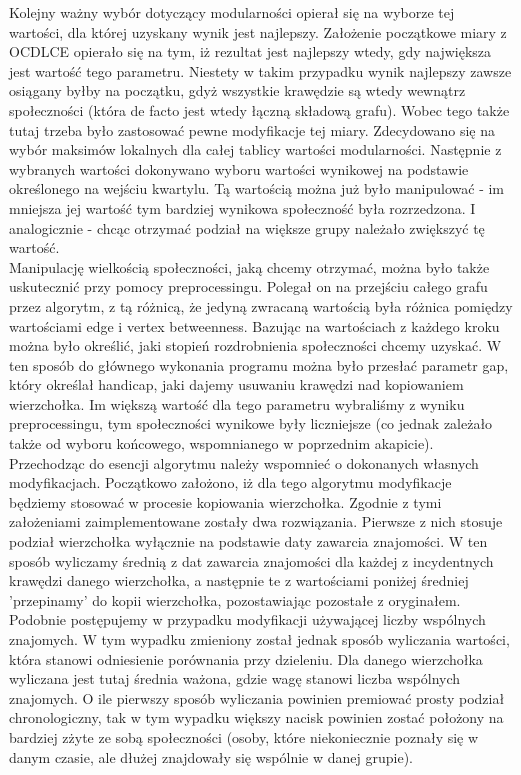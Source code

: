 \documentclass{article}
\begin{document}
Kolejny ważny wybór dotyczący modularności opierał się na wyborze tej wartości, dla której uzyskany wynik jest najlepszy. Założenie początkowe miary z OCDLCE opierało się na tym, iż rezultat jest najlepszy wtedy, gdy największa jest wartość tego parametru. Niestety w takim przypadku wynik najlepszy zawsze osiągany byłby na początku, gdyż wszystkie krawędzie są wtedy wewnątrz społeczności (która de facto jest wtedy łączną składową grafu). Wobec tego także tutaj trzeba było zastosować pewne modyfikacje tej miary. Zdecydowano się na wybór maksimów lokalnych dla całej tablicy wartości modularności. Następnie z wybranych wartości dokonywano wyboru wartości wynikowej na podstawie określonego na wejściu kwartylu. Tą wartością można już było manipulować - im mniejsza jej wartość tym bardziej wynikowa społeczność była rozrzedzona. I analogicznie - chcąc otrzymać podział na większe grupy należało zwiększyć tę wartość.\\

Manipulację wielkością społeczności, jaką chcemy otrzymać, można było także uskutecznić przy pomocy preprocessingu. Polegał on na przejściu całego grafu przez algorytm, z tą różnicą, że jedyną zwracaną wartością była różnica pomiędzy wartościami edge i vertex betweenness. Bazując na wartościach z każdego kroku można było określić, jaki stopień rozdrobnienia społeczności chcemy uzyskać. W ten sposób do głównego wykonania programu można było przesłać parametr gap, który określał handicap, jaki dajemy usuwaniu krawędzi nad kopiowaniem wierzchołka. Im większą wartość dla tego parametru wybraliśmy z wyniku preprocessingu, tym społeczności wynikowe były liczniejsze (co jednak zależało także od wyboru końcowego, wspomnianego w poprzednim akapicie).\\

Przechodząc do esencji algorytmu należy wspomnieć o dokonanych własnych modyfikacjach. Początkowo założono, iż dla tego algorytmu modyfikacje będziemy stosować w procesie kopiowania wierzchołka. Zgodnie z tymi założeniami zaimplementowane zostały dwa rozwiązania. Pierwsze z nich stosuje podział wierzchołka wyłącznie na podstawie daty zawarcia znajomości. W ten sposób wyliczamy średnią z dat zawarcia znajomości dla każdej z incydentnych krawędzi danego wierzchołka, a następnie te z wartościami poniżej średniej 'przepinamy' do kopii wierzchołka, pozostawiając pozostałe z oryginałem.\\

Podobnie postępujemy w przypadku modyfikacji używającej liczby wspólnych znajomych. W tym wypadku zmieniony został jednak sposób wyliczania wartości, która stanowi odniesienie porównania przy dzieleniu. Dla danego wierzchołka wyliczana jest tutaj średnia ważona, gdzie wagę stanowi liczba wspólnych znajomych. O ile pierwszy sposób wyliczania powinien premiować prosty podział chronologiczny, tak w tym wypadku większy nacisk powinien zostać położony na bardziej zżyte ze sobą społeczności (osoby, które niekoniecznie poznały się w danym czasie, ale dłużej znajdowały się wspólnie w danej grupie).
\end{document}
